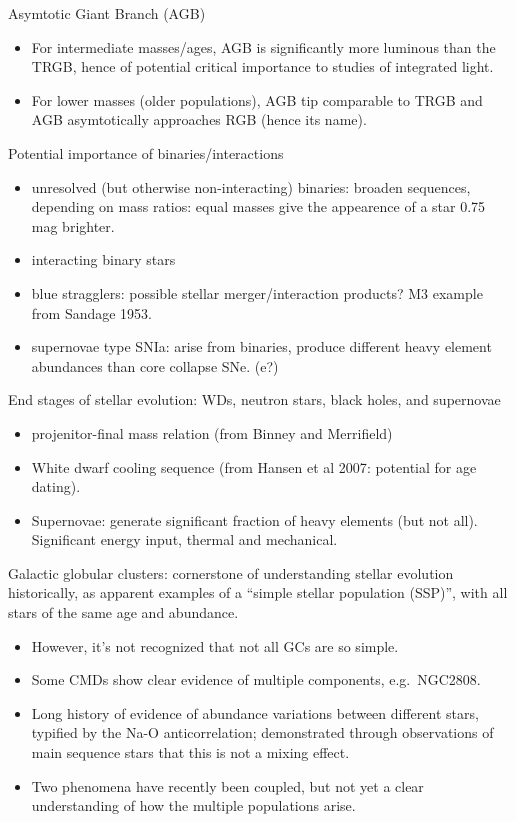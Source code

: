 \documentclass{article}
\begin{document}
Asymtotic Giant Branch (AGB)
        \begin{itemize}
            \item For intermediate masses/ages, AGB is significantly more
                luminous than the TRGB, hence of potential critical importance
                to studies of integrated light.
            \item For lower masses (older populations), AGB tip comparable
                to TRGB and AGB asymtotically approaches RGB (hence its name).
        \end{itemize}
Potential importance of binaries/interactions
        \begin{itemize}
            \item unresolved (but otherwise non-interacting) binaries:
                broaden sequences, depending on mass ratios: equal masses
                give the appearence of a star 0.75 mag brighter.
            \item interacting binary stars
            \item blue stragglers: possible stellar merger/interaction products?
                {M3 example} from Sandage 1953.
            \item supernovae type SNIa: arise from binaries, produce different
                heavy element abundances than core collapse SNe. (e?)
        \end{itemize}
End stages of stellar evolution:
        WDs, neutron stars, black holes, and supernovae
        \begin{itemize}
            \item {projenitor-final mass relation}
                (from Binney and Merrifield)
            \item {White dwarf cooling sequence}
                (from {Hansen et al 2007}: potential for
                age dating).
            \item Supernovae: generate significant fraction of heavy elements
                (but not all). Significant energy input, thermal and mechanical.
        \end{itemize}
Galactic globular clusters: cornerstone of understanding
      stellar evolution historically, as apparent examples of a
      ``simple stellar population (SSP)'', with all stars of the same
      age and abundance.
      \begin{itemize}
          \item However, it's not recognized that not all GCs are so simple.
          \item Some CMDs show clear evidence of multiple components, e.g.\
              {NGC2808}.
          \item Long history of evidence of abundance variations between
              different stars, typified by the Na-O anticorrelation;
              demonstrated through observations of main sequence stars that
              this is not a mixing effect.
          \item Two phenomena have recently been coupled, but not yet a clear
              understanding of how the multiple populations arise.
      \end{itemize}
\end{document}
